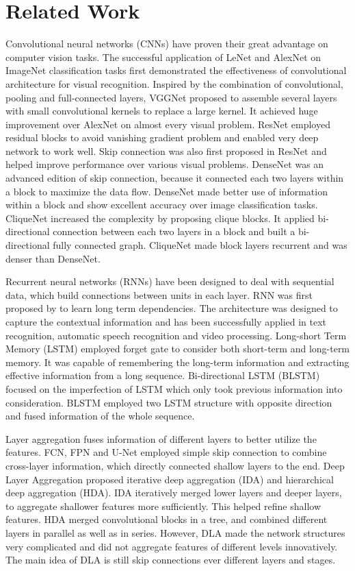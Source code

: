 \documentclass[runningheads]{llncs}
\begin{document}
\section{Related Work}
Convolutional neural networks (CNNs) have proven their great advantage on computer vision tasks. The successful application of LeNet\cite{lenet} and AlexNet\cite{alexnet} on ImageNet\cite{imagenet} classification tasks first demonstrated the effectiveness of convolutional architecture for visual recognition. Inspired by the combination of convolutional, pooling and full-connected layers, VGGNet\cite{vgg} proposed to assemble several layers with small convolutional kernels to replace a large kernel. It achieved huge improvement over AlexNet on almost every visual problem. ResNet\cite{resnet} employed residual blocks to avoid vanishing gradient problem and enabled very deep network to work well. Skip connection was also first proposed in ResNet and helped improve performance over various visual problems. DenseNet\cite{densenet} was an advanced edition of skip connection, because it connected each two layers within a block to maximize the data flow. DenseNet made better use of information within a block and show excellent accuracy over image classification tasks. CliqueNet\cite{cliquenet} increased the complexity by proposing clique blocks. It applied bi-directional connection between each two layers in a block and built a bi-directional fully connected graph. CliqueNet made block layers recurrent and was denser than DenseNet.

Recurrent neural networks (RNNs) have been designed to deal with sequential data, which build connections between units in each layer. RNN was first proposed by \cite{rnn} to learn long term dependencies. The architecture was designed to capture the contextual information and has been successfully applied in text recognition\cite{text_rnn}, automatic speech recognition\cite{speech_rnn} and video processing\cite{video_rnn}. Long-short Term Memory (LSTM)\cite{lstm} employed forget gate to consider both short-term and long-term memory.  It was capable of remembering the long-term information and extracting effective information from a long sequence. Bi-directional LSTM (BLSTM)\cite{blstm} focused on the imperfection of LSTM which only took previous information into consideration. BLSTM employed two LSTM structure with opposite direction and fused information of the whole sequence.

Layer aggregation fuses information of different layers to better utilize the features. FCN\cite{FCN}, FPN\cite{FPN} and U-Net\cite{U-Net} employed simple skip connection to combine cross-layer information, which directly connected shallow layers to the end. Deep Layer Aggregation\cite{dla} proposed iterative deep aggregation (IDA) and hierarchical deep aggregation (HDA). IDA iteratively merged lower layers and deeper layers, to aggregate shallower features more sufficiently. This  helped refine shallow features. HDA merged convolutional blocks in a tree, and combined different layers in parallel as well as in series. However, DLA made the network structures very complicated and did not aggregate features of different levels innovatively. The main idea of DLA is still skip connections ever different layers and stages.
\end{document}
